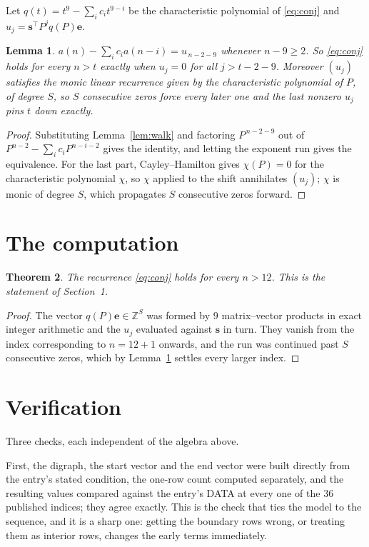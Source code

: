 \documentclass[11pt,a4paper]{article}
\theoremstyle{plain}
\newtheorem{theorem}{Theorem}
\newtheorem{lemma}[theorem]{Lemma}
\theoremstyle{definition}
\begin{document}
Let $q(t)=t^{9}-\sum_i c_i t^{9-i}$ be the characteristic polynomial of
\eqref{eq:conj} and $u_j=\mathbf{s}^{\!\top}P^{j}q(P)\mathbf{e}$.

\begin{lemma}\label{lem:crit}
$a(n)-\sum_i c_i a(n-i)=u_{\,n-2-9}$ whenever $n-9\ge2$. So \eqref{eq:conj}
holds for every $n>t$ exactly when $u_j=0$ for all $j>t-2-9$. Moreover $(u_j)$
satisfies the monic linear recurrence given by the characteristic polynomial of $P$, of
degree $S$, so $S$ consecutive zeros force every later one and the last nonzero $u_j$ pins
$t$ down exactly.
\end{lemma}

\begin{proof}
Substituting Lemma~\ref{lem:walk} and factoring $P^{\,n-2-9}$ out of
$P^{n-2}-\sum_i c_i P^{n-i-2}$ gives the identity, and letting the exponent run gives the
equivalence. For the last part, Cayley--Hamilton gives $\chi(P)=0$ for the characteristic
polynomial $\chi$, so $\chi$ applied to the shift annihilates $(u_j)$; $\chi$ is monic of
degree $S$, which propagates $S$ consecutive zeros forward.
\end{proof}

\section{The computation}

\begin{theorem}
The recurrence \eqref{eq:conj} holds for every $n>12$. This is the statement of
Section~1.
\end{theorem}

\begin{proof}
The vector $q(P)\mathbf{e}\in\mathbb{Z}^{S}$ was formed by $9$ matrix--vector
products in exact integer arithmetic and the $u_j$ evaluated against $\mathbf{s}$ in turn.
They vanish from the index corresponding to $n=12+1$ onwards, and the run was continued
past $S$ consecutive zeros, which by Lemma~\ref{lem:crit} settles every larger index.
\end{proof}

\section{Verification}

Three checks, each independent of the algebra above.

First, the digraph, the start vector and the end vector were built directly from the
entry's stated condition, the one-row count computed separately, and the resulting values
compared against the entry's DATA at every one of the $36$ published indices; they
agree exactly. This is the check that ties the model to the sequence, and it is a sharp one:
getting the boundary rows wrong, or treating them as interior rows, changes the early terms
immediately.
\end{document}
